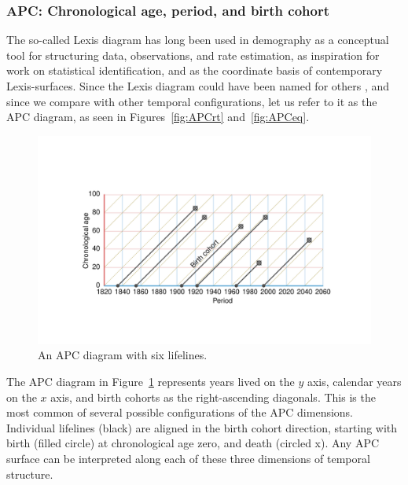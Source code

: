 \documentclass[12pt,oneside,a4paper]{article} %
\newcommand\tgh[1]{\raisebox{-.25\height}{\texttt{[image: Figures/triadtable/triad\#1.pdf]}}}
\begin{document}
\subsubsection{APC: Chronological age, period, and birth cohort}%
\FloatBarrier
The so-called Lexis diagram has long been used in demography as a conceptual
tool for structuring data, observations, and rate estimation, as inspiration for work
on statistical identification, and as the coordinate basis of contemporary
Lexis-surfaces. Since the Lexis diagram could have been named for others
\citep{keiding2011age, vandeschrick2001lexis}, and since we compare with other
temporal configurations, let us refer to it as the APC diagram, as seen in
Figures~\ref{fig:APCrt} and~\ref{fig:APCeq}. 

\begin{figure}[h!] 
\caption{An APC diagram with six lifelines.}
\label{fig:APC}
\centering
\vspace{-5em}
\includegraphics[scale=0.8]{Figures/APCrt.pdf}
\end{figure}

The APC diagram in Figure~\ref{fig:APC} represents years lived on the $y$
axis, calendar years on the $x$ axis, and birth cohorts as the right-ascending
diagonals. This is the most common of several possible configurations
of the APC dimensions. Individual lifelines (black) are aligned in the birth
cohort direction, starting with birth (filled circle) at chronological age zero, and death
(circled x). Any APC surface can be interpreted along each of these
three dimensions of temporal structure. 
\end{document}
